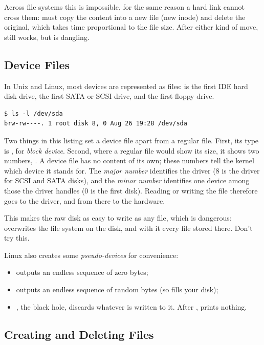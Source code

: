 Across file systems this is impossible, for the same reason a hard link cannot cross them:  must copy the content into a new file (new inode) and delete the original, which takes time proportional to the file size. After either kind of move,  still works, but  is dangling.

\clearpage
\subsection{Device Files}

In Unix and Linux, most devices are represented as files:  is the first IDE hard disk drive,  the first SATA or SCSI drive, and  the first floppy drive.
\begin{lstlisting}[style=sh]
$ ls -l /dev/sda
brw-rw----. 1 root disk 8, 0 Aug 26 19:28 /dev/sda
\end{lstlisting}
Two things in this listing set a device file apart from a regular file. First, its type is , for \emph{block device}. Second, where a regular file would show its size, it shows two numbers, . A device file has no content of its own; these numbers tell the kernel which device it stands for. The \emph{major number} identifies the driver (8 is the driver for SCSI and SATA disks), and the \emph{minor number} identifies one device among those the driver handles (0 is the first disk). Reading or writing the file therefore goes to the driver, and from there to the hardware.

This makes the raw disk as easy to write as any file, which is dangerous:  overwrites the file system on the disk, and with it every file stored there. Don't try this.

Linux also creates some \emph{pseudo-devices} for convenience:
\begin{itemize}
  \item {} outputs an endless sequence of zero bytes;
  \item {} outputs an endless sequence of random bytes (so  fills your disk);
  \item {}, the black hole, discards whatever is written to it. After ,  prints nothing.
\end{itemize}

\subsection{Creating and Deleting Files}

